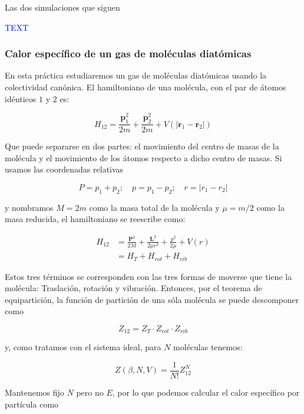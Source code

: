 \documentclass[11pt, a4paper]{article} %
\theoremstyle{named}
\begin{document}
Las dos simulaciones que siguen

\textcolor{blue}{TEXT}

\subsubsection{Calor específico de un gas de moléculas diatómicas}\label{sec:diatomicas}

En esta práctica estudiaremos un gas de moléculas diatómicas usando la colectividad canónica. El hamiltoniano de una molécula, con el par de átomos idénticos $1$ y $2$ es:

$$
H_{12}=\frac{\mathbf{p}_{1}^{2}}{2 m}+\frac{\mathbf{p}_{2}^{2}}{2 m}+V\left(\left|\mathbf{r}_{1}-\mathbf{r}_{2}\right|\right)
$$

Que puede separarse en dos partes: el movimiento del centro de masas de la molécula y el movimiento de los átomos respecto a dicho centro de masas. Si usamos las coordenadas relativas

$$
P = p_1 + p_2; \quad p = p_1 - p_2; \quad r = |r_1 - r_2|
$$

y nombramos $M = 2m$ como la masa total de la molécula y $\mu = m/2$ como la masa reducida, el hamiltoniano se reescribe como:

\begin{equation}\label{eq:diatHtot}
    \begin{aligned}
        H_{12}&=\frac{\mathbf{P}^{2}}{2 M}+\frac{\mathbf{L}^{2}}{2 \mu r^{2}}+{\frac{p^{2}}{2 \mu}+V(r)} \nonumber \\
        &=H_{T}+H_{rot}+H_{vib}
    \end{aligned}
\end{equation}

Estos tres términos se corresponden con las tres formas de moverse que tiene la molécula: Traslación, rotación y vibración. Entonces, por el teorema de equipartición, la función de partición de una sóla molécula se puede descomponer como

\begin{equation}
    Z_{12} = Z_T \cdot Z_{rot} \cdot Z_{vib}
\end{equation}

y, como tratamos con el sistema ideal, para $N$ moléculas tenemos:

$$
Z(\beta, N, V) = \frac{1}{N!} Z_{12}^N
$$

Mantenemos fijo $N$ pero no $E$, por lo que podemos calcular el calor específico por partícula como
\end{document}
